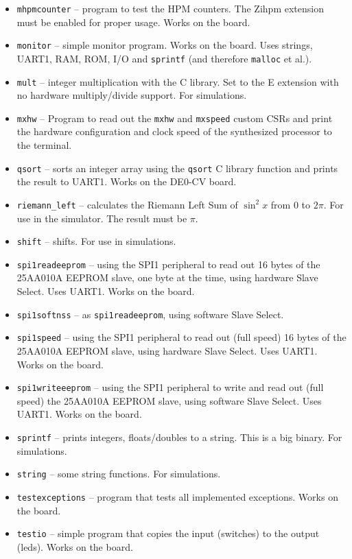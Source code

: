 \documentclass[12pt]{article}
\begin{document}
\begin{itemize}
\item \lstinline|mhpmcounter| -- program to test the HPM counters. The Zihpm extension must be enabled for proper usage. Works on the board.
\item \lstinline|monitor| -- simple monitor program. Works on the board. Uses strings, UART1, RAM, ROM, I/O and \lstinline|sprintf| (and therefore \lstinline|malloc| et al.).
\item \lstinline|mult| -- integer multiplication with the C library. Set to the E extension with no hardware multiply/divide support. For simulations.
\item \lstinline|mxhw| -- Program to read out the \lstinline|mxhw| and \lstinline|mxspeed| custom CSRs and print the hardware configuration and clock speed of the synthesized processor to the terminal.
\item \lstinline|qsort| -- sorts an integer array using the \lstinline|qsort| C library function and prints the result to UART1. Works on the DE0-CV board.
\item \lstinline|riemann_left| -- calculates the Riemann Left Sum of $\sin^2 x$ from $0$ to $2\pi$. For use in the simulator. The  result must be $\pi$.
\item \lstinline|shift| -- shifts. For use in simulations.
\item \lstinline|spi1readeeprom| -- using the SPI1 peripheral to read out 16 bytes of the 25AA010A EEPROM slave, one byte at the time, using hardware Slave Select. Uses UART1. Works on the board.
\item \lstinline|spi1softnss| -- as \lstinline|spi1readeeprom|, using software Slave Select.
\item \lstinline|spi1speed| -- using the SPI1 peripheral to read out (full speed) 16 bytes of the 25AA010A EEPROM slave, using hardware Slave Select. Uses UART1. Works on the board.
\item \lstinline|spi1writeeeprom| -- using the SPI1 peripheral to write and read out (full speed) the 25AA010A EEPROM slave, using software Slave Select. Uses UART1. Works on the board.
\item \lstinline|sprintf| -- prints integers, floats/doubles to a string. This is a big binary. For simulations.
\item \lstinline|string| -- some string functions. For simulations.
\item \lstinline|testexceptions| -- program that tests all implemented exceptions. Works on the board.
\item \lstinline|testio| -- simple program that copies the input (switches) to the output (leds). Works on the board.

\end{itemize}
\end{document}
